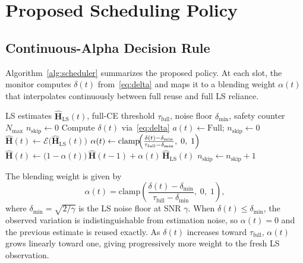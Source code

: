 
\section{Proposed Scheduling Policy}\label{Design}

\subsection{Continuous-Alpha Decision Rule}

Algorithm~\ref{alg:scheduler} summarizes the proposed policy.
At each slot, the monitor computes $\delta(t)$ from~\eqref{eq:delta} and maps it to a blending weight $\alpha(t)$ that interpolates continuously between full reuse and full LS reliance.

\begin{algorithm}[t]
\caption{Opportunistic CE Inference Scheduler}\label{alg:scheduler}
\begin{algorithmic}[1]
\Require LS estimates $\hat{\mathbf{H}}_{\text{LS}}(t)$, full-CE threshold $\tau_{\mathrm{full}}$, noise floor $\delta_{\min}$, safety counter $N_{\max}$
\State $n_{\text{skip}} \gets 0$
    \State Compute $\delta(t)$ via~\eqref{eq:delta}
     
        \State $a(t) \gets \text{Full}$;\; $n_{\text{skip}} \gets 0$
        \State $\hat{\mathbf{H}}(t) \gets \mathcal{E}\bigl(\hat{\mathbf{H}}_{\text{LS}}(t)\bigr)$
    \Else {}
        \State $\alpha(t) \gets \mathrm{clamp}\!\Bigl(\frac{\delta(t) - \delta_{\min}}{\tau_{\mathrm{full}} - \delta_{\min}},\; 0,\; 1\Bigr)$ 
        \State $\hat{\mathbf{H}}(t) \gets \bigl(1 - \alpha(t)\bigr)\,\hat{\mathbf{H}}(t{-}1) + \alpha(t)\,\hat{\mathbf{H}}_{\text{LS}}(t)$
        \State $n_{\text{skip}} \gets n_{\text{skip}} + 1$
    \EndIf
\EndFor
\end{algorithmic}
\end{algorithm}

The blending weight is given by
%
\begin{equation}\label{eq:alpha}
  \alpha(t) = \mathrm{clamp}\!\left(
    \frac{\delta(t) - \delta_{\min}}{\tau_{\mathrm{full}} - \delta_{\min}},\; 0,\; 1
  \right),
\end{equation}
%
where $\delta_{\min} = \sqrt{2/\gamma}$ is the LS noise floor at SNR $\gamma$.
When $\delta(t) \leq \delta_{\min}$, the observed variation is indistinguishable from estimation noise, so $\alpha(t) = 0$ and the previous estimate is reused exactly.
As $\delta(t)$ increases toward $\tau_{\mathrm{full}}$, $\alpha(t)$ grows linearly toward one, giving progressively more weight to the fresh LS observation.


